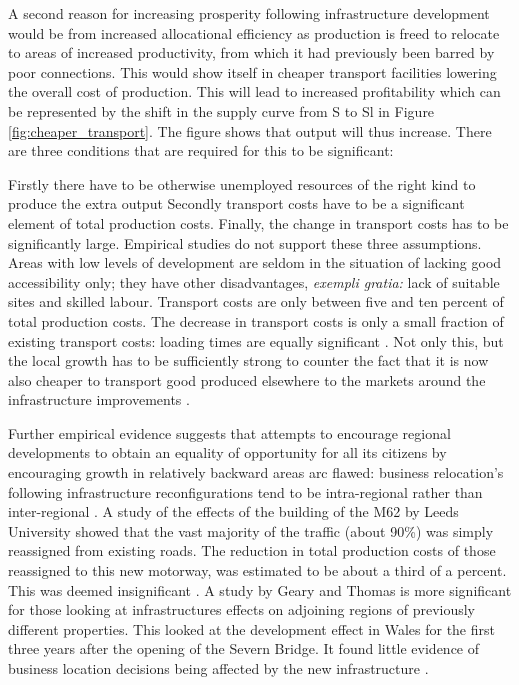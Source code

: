 

A second reason for increasing prosperity following infrastructure development would be from increased allocational efficiency as production is freed to relocate to areas of increased productivity, from which it had previously been barred by poor connections. This would show itself in cheaper transport facilities lowering the overall cost of production. This will lead to increased profitability which can be represented by the shift in the supply curve from S to Sl in Figure \ref{fig:cheaper_transport}. The figure shows that output will thus increase. There are three conditions that are required for this to be significant:

Firstly there have to be otherwise unemployed resources of the right kind to produce the extra output Secondly transport costs have to be a significant element of total production costs. Finally, the change in transport costs has to be significantly large. Empirical studies do not support these three assumptions. Areas with low levels of development are seldom in the situation of lacking good accessibility only; they have other disadvantages, \textit{exempli gratia:} lack of suitable sites and skilled labour. Transport costs are only between five and ten percent of total production costs. The decrease in transport costs is only a small fraction of existing transport costs: loading times are equally significant \cite{Parkinson:1981}. Not only this, but the local growth has to be sufficiently strong to counter the fact that it is now also cheaper to transport good produced elsewhere to the markets around the infrastructure improvements \cite{Chisholm:1973}.

Further empirical evidence suggests that attempts to encourage regional developments to obtain an equality of opportunity for all its citizens by encouraging growth in relatively backward areas arc flawed: business relocation's following infrastructure reconfigurations tend to be intra-regional rather than inter-regional \cite{Parkinson:1981}. A study of the effects of the building of the M62 by Leeds University showed that the vast majority of the traffic (about 90\%) was simply reassigned from existing roads. The reduction in total production costs of those reassigned to this new motorway, was estimated to be about a third of a percent. This was deemed insignificant \cite{Gwilliam:1978}. A study by Geary and Thomas is more significant for those looking at infrastructures effects on adjoining regions of previously different properties. This looked at the development effect in Wales for the first three years after the opening of the Severn Bridge. It found little evidence of business location decisions being affected by the new infrastructure \cite{Geary:1973}.

